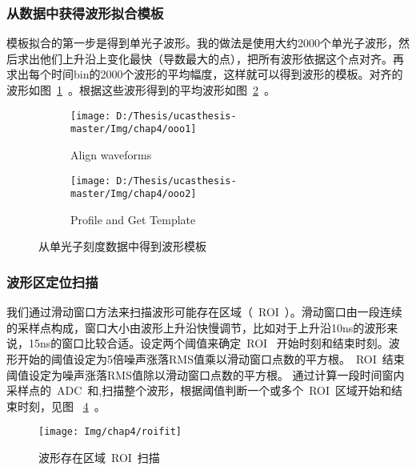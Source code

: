 \subsubsection{从数据中获得波形拟合模板}
模板拟合的第一步是得到单光子波形。我的做法是使用大约2000个单光子波形，然后求出他们上升沿上变化最快（导数最大的点），把所有波形依据这个点对齐。再求出每个时间bin的2000个波形的平均幅度，这样就可以得到波形的模板。对齐的波形如图~\ref{fig:ooo_1}~。根据这些波形得到的平均波形如图~\ref{fig:ooo_2}~。
\begin{figure}[!htbp]
  \centering
  \begin{subfigure}[b]{\MySubFactor\textwidth}
    \texttt{[image: D:/Thesis/ucasthesis-master/Img/chap4/ooo1]}
    \caption{ Align waveforms }
    \label{fig:ooo_1}
  \end{subfigure}%
  \quad\quad\quad\quad\quad\quad%
  \begin{subfigure}[b]{\MySubFactor\textwidth}
    \texttt{[image: D:/Thesis/ucasthesis-master/Img/chap4/ooo2]}
    \caption{ Profile and Get Template }
    \label{fig:ooo_2}
  \end{subfigure}
    \caption{ 从单光子刻度数据中得到波形模板 }
  \label{fig:ooo}
\end{figure}
\subsubsection{波形区定位扫描}
我们通过滑动窗口方法来扫描波形可能存在区域（~ROI~）。滑动窗口由一段连续的采样点构成，窗口大小由波形上升沿快慢调节，比如对于上升沿10ns的波形来说，15ns的窗口比较合适。设定两个阈值来确定~ROI~ 开始时刻和结束时刻。波形开始的阈值设定为5倍噪声涨落RMS值乘以滑动窗口点数的平方根。~ROI~结束阈值设定为噪声涨落RMS值除以滑动窗口点数的平方根。
通过计算一段时间窗内采样点的~ADC~和,扫描整个波形，根据阈值判断一个或多个~ROI~区域开始和结束时刻，见图
~\ref{fig:roifit}~。
\begin{figure}[!htbp]
  \centering
   \texttt{[image: Img/chap4/roifit]}
    \caption{波形存在区域~ROI~扫描}
  \label{fig:roifit}
\end{figure}
